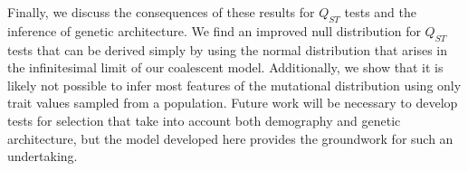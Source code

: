 Finally, we discuss the consequences of these results for $Q_{ST}$ tests and the
inference of genetic architecture. We find an improved null distribution for
$Q_{ST}$ tests that can be derived simply by using the normal distribution that
arises in the infinitesimal limit of our coalescent model. Additionally, we show
that it is likely not possible to infer most features of the mutational distribution
using only trait values sampled from a population. Future work will be necessary
to develop tests for selection that take into account both demography and
genetic architecture, but the model developed here provides the groundwork for
such an undertaking. 

